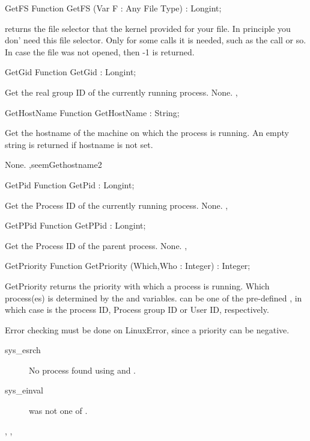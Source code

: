 \begin{function}{GetFS}
\Declaration
Function GetFS (Var F : Any File Type) : Longint;

\Description
{} returns the file selector that the kernel provided for your
file. In principle you don' need this file selector. Only for some calls
it is needed, such as the  call or so.
\Errors
In case the file was not opened, then -1 is returned.
\SeeAlso
{}
\end{function}
\begin{function}{GetGid}
\Declaration
Function GetGid  : Longint;

\Description
 Get the real group ID of the currently running process.
\Errors
None.
\SeeAlso
{},  
\end{function}
\begin{function}{GetHostName}
\Declaration
Function GetHostName  : String;

\Description

Get the hostname of the machine on which the process is running.
An empty string is returned if hostname is not set.

\Errors
None.
\SeeAlso
 ,seem{Gethostname}{2} 
\end{function}
\begin{function}{GetPid}
\Declaration
Function GetPid  : Longint;

\Description
 Get the Process ID of the currently running process.
\Errors
None.
\SeeAlso
{}, 
\end{function}
\begin{function}{GetPPid}
\Declaration
Function GetPPid  : Longint;

\Description
 Get the Process ID of the parent process.
\Errors
None.
\SeeAlso
{}, 
\end{function}
\begin{function}{GetPriority}
\Declaration
Function GetPriority (Which,Who : Integer) : Integer;

\Description

GetPriority returns the priority with which a process is running.
Which process(es) is determined by the  and  variables.
 can be one of the pre-defined , in which case  is the process ID, Process group ID or
User ID, respectively.

\Errors

 Error checking must be done on LinuxError, since a priority can be negative.
 \begin{description}
 \item[sys\_esrch] No process found using  and .
 \item[sys\_einval]  was not one of .
 \end{description}
 
\SeeAlso
{}, , 
\end{function}
